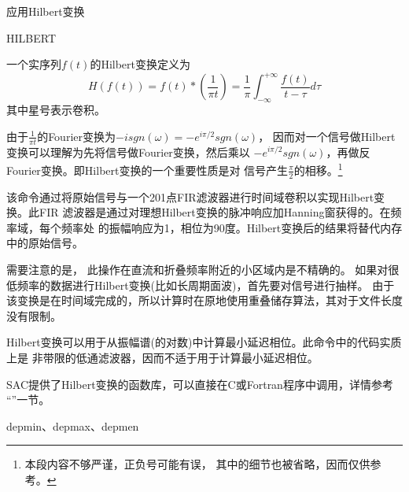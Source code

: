 \label{cmd:hilbert}

应用Hilbert变换

\begin{SACSTX}
HILBERT
\end{SACSTX}

一个实序列$f(t)$的Hilbert变换定义为
\[
    H(f(t)) = f(t) * (\frac{1}{\pi t}) =
    \frac{1}{\pi} \int_{-\infty}^{+\infty} \frac{f(t)}{t-\tau} d\tau
\]
其中星号表示卷积。

由于$\frac{1}{\pi t}$的Fourier变换为$-i sgn(\omega)=-e^{i\pi/2} sgn(\omega)$，
因而对一个信号做Hilbert变换可以理解为先将信号做Fourier变换，然后乘以
$-e^{i\pi/2} sgn(\omega)$，再做反Fourier变换。即Hilbert变换的一个重要性质是对
信号产生$\frac{\pi}{2}$的相移。\footnote{本段内容不够严谨，正负号可能有误，
其中的细节也被省略，因而仅供参考。}

该命令通过将原始信号与一个201点FIR滤波器进行时间域卷积以实现Hilbert变换。此FIR
滤波器是通过对理想Hilbert变换的脉冲响应加Hanning窗获得的。在频率域，每个频率处
的振幅响应为1，相位为90度。Hilbert变换后的结果将替代内存中的原始信号。

需要注意的是， 此操作在直流和折叠频率附近的小区域内是不精确的。
如果对很低频率的数据进行Hilbert变换(比如长周期面波)，首先要对信号进行抽样。
由于该变换是在时间域完成的，所以计算时在原地使用重叠储存算法，其对于文件长度没有限制。

Hilbert变换可以用于从振幅谱(的对数)中计算最小延迟相位。此命令中的代码实质上是
非带限的低通滤波器，因而不适于用于计算最小延迟相位。

SAC提供了Hilbert变换的函数库，可以直接在C或Fortran程序中调用，详情参考
``''一节。

depmin、depmax、depmen
